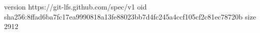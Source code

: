 version https://git-lfs.github.com/spec/v1
oid sha256:8ffad6ba7fc17ea9990818a13fe88023bb7d4fc245a4ccf105cf2c81ec78720b
size 2912
